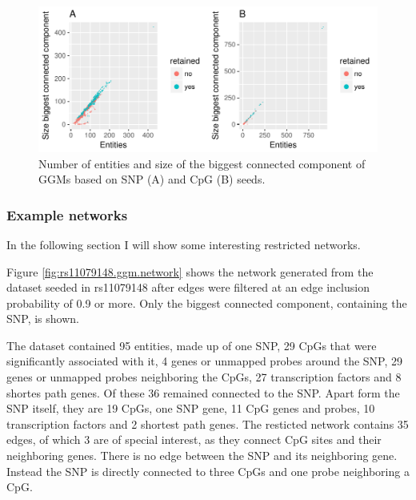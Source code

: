 \documentclass[a4paper,12pt,twoside,openright]{article}
\begin{document}
\begin{figure}[tb]
	\includegraphics[scale = 1, keepaspectratio = true]{../figures/hervS2_ggm_entity_cc_size_scatter}  
	\caption{Number of entities and size of the biggest connected component of GGMs based on SNP (A) and CpG (B) seeds.}
    \label{fig:ggm.entity.cc.scatter}
\end{figure}

\subsubsection{Example networks}
\label{Results:Example networks}
In the following section I will show some interesting restricted networks. 

Figure \ref{fig:rs11079148.ggm.network} shows the network generated from the dataset seeded in rs11079148 after edges were filtered at an edge inclusion probability of 0.9 or more. Only the biggest connected component, containing the SNP, is shown. 

The dataset contained 95 entities, made up of one SNP, 29 CpGs that were significantly associated with it, 4 genes or unmapped probes around the SNP, 29 genes or unmapped probes neighboring the CpGs, 27 transcription factors and 8 shortes path genes. Of these 36 remained connected to the SNP. Apart form the SNP itself, they are 19 CpGs, one SNP gene, 11 CpG genes and probes, 10 transcription factors and 2 shortest path genes. The resticted network contains 35 edges, of which 3 are of special interest, as they connect CpG sites and their neighboring genes. There is no edge between the SNP and its neighboring gene. Instead the SNP is directly connected to three CpGs and one probe neighboring a CpG. 
\end{document}
